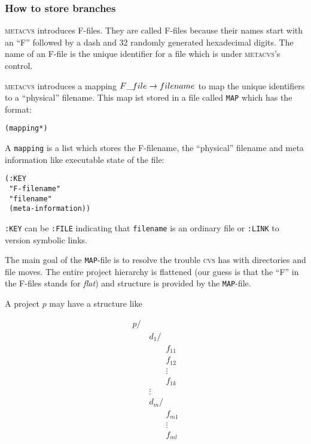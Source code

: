 \documentclass[fleqn, 10pt, a4paper]{report} \usepackage{amssymb}
\begin{document}
\subsubsection{How to store branches}

\textsc{metacvs} introduces F-files. They are called F-files because
their names start with an ``F'' followed by a dash and 32 randomly
generated hexadecimal digits. The name of an F-file is the unique
identifier for a file which is under \textsc{metacvs}'s control.

\textsc{metacvs} introduces a mapping $\mathnormal{F\_file}
\rightarrow filename$ to map the unique identifiers to a ``physical''
filename. This map ist stored in a file called \texttt{MAP} which has
the format:

\begin{verbatim}
(mapping*)
\end{verbatim}

A \texttt{mapping} is a list which stores the F-filename, the
``physical'' filename and meta information like executable state of
the file:

\begin{verbatim}
(:KEY
 "F-filename"
 "filename"
 (meta-information))
\end{verbatim}

\texttt{:KEY} can be \texttt{:FILE} indicating that \texttt{filename}
is an ordinary file or \texttt{:LINK} to version symbolic links.

The main goal of the \texttt{MAP}-file is to resolve the trouble
\textsc{cvs} has with directories and file moves. The entire project
hierarchy is flattened (our guess is that the ``F'' in the F-files
stands for \emph{flat}) and structure is provided by the
\texttt{MAP}-file.

A project $p$ may have a structure like

\begin{displaymath}
  \begin{array}{l}
    p/ \\
    \qquad d_1/ \\
    \qquad\qquad f_{11} \\
    \qquad\qquad f_{12} \\
    \qquad\qquad \vdots \\
    \qquad\qquad f_{1k} \\
    \qquad \vdots \\
    \qquad d_m/ \\
    \qquad\qquad f_{m1} \\
    \qquad\qquad \vdots \\
    \qquad\qquad f_{ml}
  \end{array}
\end{displaymath}
\end{document}
